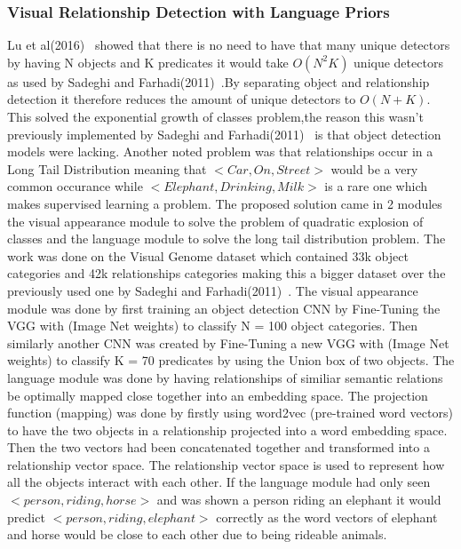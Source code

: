 \documentclass{csfyp}
\newcommand\tab[1][1cm]{\hspace*{#1}}
\begin{document}
\subsubsection{Visual Relationship Detection with Language Priors}
Lu et al(2016)~\cite{lu2016visual} showed that there is no need to have that many unique detectors by having N objects and K predicates it would take $O(N^2 K)$ unique detectors as used by Sadeghi and Farhadi(2011)~\cite{VisualPhrases}.By separating object and relationship detection it therefore reduces the amount of unique detectors to $O(N+K)$. This solved the exponential growth of classes problem,the reason this wasn't previously implemented by Sadeghi and Farhadi(2011)~\cite{VisualPhrases} is that object detection models were lacking. Another noted problem was that relationships occur in a Long Tail Distribution meaning that $<Car,On,Street>$ would be a very common occurance while $<Elephant, Drinking , Milk>$ is a rare one which makes supervised learning a problem. The proposed solution came in 2 modules the visual appearance module to solve the problem of quadratic explosion of classes and the language module to solve the long tail distribution problem. The work was done on the Visual Genome dataset which contained 33k object categories and 42k relationships  categories making this a bigger dataset over the previously used one by Sadeghi and Farhadi(2011)~\cite{VisualPhrases}. 
\tab
The visual appearance module was done by first training an object detection CNN by Fine-Tuning the VGG with (Image Net weights) to classify N = 100 object categories. Then similarly another CNN was created by Fine-Tuning a new VGG with (Image Net weights) to classify K = 70 predicates by using the Union box of two objects. 
\tab
The language module was done by having relationships of similiar semantic relations be optimally mapped close together into an embedding space. The projection function (mapping) was done by firstly using word2vec (pre-trained word vectors) to have the two objects in a relationship projected into a word embedding space. Then the two vectors had been concatenated together and transformed into a relationship vector space. The relationship vector space is used to represent how all the objects interact with each other. If the language module had only seen $<person , riding , horse>$ and was shown a person riding an elephant it would predict $<person , riding , elephant>$ correctly as the word vectors of elephant and horse would be close to each other due to being rideable animals.
\\
\tab
\end{document}
